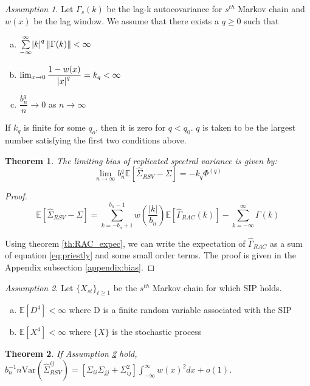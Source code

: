 \documentclass[12pt]{article}
\newcommand{\E}{\mathbb{E}}
\newcommand{\Var}{\text{Var}}
\newtheorem{theorem}{Theorem}
\theoremstyle{remark}
\newtheorem{ass}{Assumption}
\begin{document}
\begin{ass} \label{ass:bias}
    Let $\Gamma_s(k)$ be the lag-k autocovariance for $s^{th}$ Markov chain and $w(x)$ be the lag window. We assume that there exists a $q \geq 0$ such that
    \begin{enumerate} [a.]
        \item $\sum\limits_{-\infty}^{\infty}\abs{k}^q \|\Gamma(k)\| < \infty$
        \item $\lim _{x \to 0}\dfrac{1 - w(x)}{\abs{x}^q} = k_q < \infty$
        \item $\dfrac{b_n^q}{n} \to 0$ as $n \to \infty$
    \end{enumerate}
    
    If $k_q$ is finite for some $q_o$, then it is zero for $q < q_0$. $q$ is taken to be the largest number satisfying the first two conditions above.
\end{ass}


\begin{theorem}\label{th:rsv_bias}
The limiting bias of replicated spectral variance is given by:
\[
 \lim_{n \to \infty}b_n^q\mathbb{E} \left[\hat{\Sigma}_{RSV} - \Sigma \right] = -k_q\Phi^{(q)}
 \]
\end{theorem}

\begin{proof}
\[
\mathbb{E} \left[\hat{\Sigma}_{RSV} - \Sigma \right] = \sum_{k=-b_n+1}^{b_n-1} w\left(\dfrac{|k|}{b_n}\right)\mathbb{E} \left[\hat{\Gamma}_{RAC}(k) \right] - \sum_{k=-\infty}^{\infty}\Gamma(k)
\]

Using theorem \ref{th:RAC_expec}, we can write the expectation of $\hat{\Gamma}_{RAC}$ as  a sum of equation \ref{eq:priestly} and some small order terms.
The proof is given in the Appendix subsection \ref{appendix:bias}.
\end{proof}


\begin{ass} \label{ass:variance_cal}
Let $\{X_{st}\}_{t \geq 1}$ be the $s^{th}$ Markov chain for which SIP holds. 
\begin{enumerate}[a.]
    \item $\E[D^4] < \infty$ where D is a finite random variable associated with the SIP
    \item $\E[X^4] < \infty$ where $\{X\}$ is the stochastic process
\end{enumerate}
\end{ass}


\begin{theorem} \label{th:rsv_variance}
 If Assumption \ref{ass:variance_cal} hold, $b_n^{-1}{n}\Var \left(\hat{\Sigma}_{RSV}^{ij} \right) = [\Sigma_{ii}\Sigma_{jj} + \Sigma_{ij}^2]\int_{-\infty}^{\infty}w(x)^2dx  + o(1)$.
\end{theorem}
\end{document}
